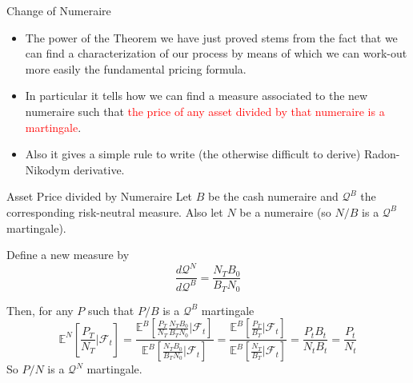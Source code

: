 \documentclass{beamer}
\begin{document}
\begin{frame}{Change of Numeraire}
	\begin{itemize}
		\item The power of the Theorem we have just proved stems from the fact that we can find a characterization of our process by means of which we can work-out more easily the fundamental pricing formula.
		\item In particular it tells how we can find a measure associated to the new numeraire such that \textcolor{red}{the price of any asset divided by that numeraire is a martingale}.
		\item Also it gives a simple rule to write (the otherwise difficult to derive) Radon-Nikodym derivative.
	\end{itemize}
\end{frame}

\begin{frame}{Asset Price divided by Numeraire}
Let $B$ be the cash numeraire and $\mathcal{Q}^B$ the corresponding risk-neutral measure. Also let $N$ be a numeraire (so $N/B$ is a $\mathcal{Q}^B$ martingale). 

Define a new measure by
\begin{equation*}
	\frac{d\mathcal{Q}^N}{d\mathcal{Q}^B} = \frac{N_TB_0}{B_TN_0}
\end{equation*}

Then, for any $P$ such that $P/B$ is a $\mathcal{Q}^B$ martingale
\begin{equation*}
\mathbb{E}^N\left[\frac{P_T}{N_T}\bigg|\mathcal{F}_t\right] = \frac{\mathbb{E}^B\left[\frac{P_T}{N_T}\frac{N_TB_0}{B_TN_0}\bigg|\mathcal{F}_t\right]}{\mathbb{E}^B\left[\frac{N_TB_0}{B_TN_0}\bigg|\mathcal{F}_t\right]}
=\frac{\mathbb{E}^B\left[\frac{P_T}{B_T}\bigg|\mathcal{F}_t\right]}
{\mathbb{E}^B\left[\frac{N_T}{B_T}\bigg|\mathcal{F}_t\right]}
=\frac{P_tB_t}{N_tB_t}=\frac{P_t}{N_t}
\end{equation*}
So $P/N$ is a $\mathcal{Q}^N$ martingale.
\end{frame}
\end{document}
